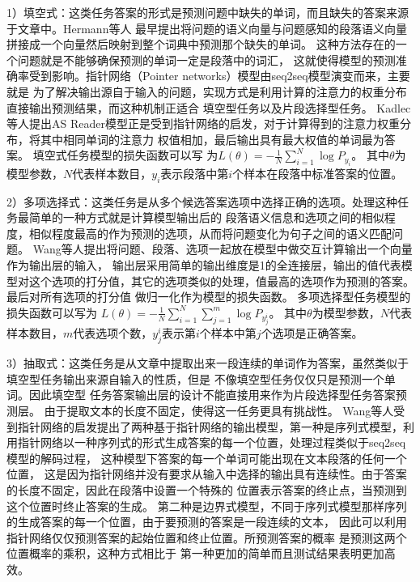 1）填空式：这类任务答案的形式是预测问题中缺失的单词，而且缺失的答案来源于文章中。Hermann等人\cite{Hermann}
最早提出将问题的语义向量与问题感知的段落语义向量拼接成一个向量然后映射到整个词典中预测那个缺失的单词。
这种方法存在的一个问题就是不能够确保预测的单词一定是段落中的词汇，
这就使得模型的预测准确率受到影响。指针网络（Pointer networks）模型由seq2seq模型演变而来，主要就是
为了解决输出源自于输入的问题，实现方式是利用计算的注意力的权重分布直接输出预测结果，而这种机制正适合
填空型任务以及片段选择型任务。
Kadlec等人提出AS Reader模型正是受到指针网络的启发，对于计算得到的注意力权重分布，将其中相同单词的注意力
权值相加，最后输出具有最大权值的单词最为答案。
填空式任务模型的损失函数可以写
为$L(\theta)=-\displaystyle\frac{1}{N}\sum_{i=1}^{N}\log P_{y_i}$。
其中$\theta$为模型参数，$N$代表样本数目，$y_i$表示段落中第$i$个样本在段落中标准答案的位置。

2）多项选择式：这类任务是从多个候选答案选项中选择正确的选项。处理这种任务最简单的一种方式就是计算模型输出后的
段落语义信息和选项之间的相似程度，相似程度最高的作为预测的选项，从而将问题变化为句子之间的语义匹配问题。
Wang等人\cite{Co-matching}提出将问题、段落、选项一起放在模型中做交互计算输出一个向量作为输出层的输入，
输出层采用简单的输出维度是1的全连接层，输出的值代表模型对这个选项的打分值，其它的选项类似的处理，值最高的选项作为预测的答案。
最后对所有选项的打分值
做归一化作为模型的损失函数。
多项选择型任务模型的损失函数可以写为
$L(\theta)=-\displaystyle\frac{1}{N}\sum_{i=1}^{N}\sum_{j=1}^{m}\log P_{y_{j}^i}$。
其中$\theta$为模型参数，$N$代表样本数目，$m$代表选项个数，$y_{j}^i$表示第$i$个样本中第$j$个选项是正确答案。

3）抽取式：这类任务是从文章中提取出来一段连续的单词作为答案，虽然类似于填空型任务输出来源自输入的性质，但是
不像填空型任务仅仅只是预测一个单词。因此填空型
任务答案输出层的设计不能直接用来作为片段选择型任务答案预测层。
由于提取文本的长度不固定，使得这一任务更具有挑战性。
Wang等人受到指针网络的启发提出了两种基于指针网络的输出模型，第一种是序列式模型，利用指针网络以一种序列式的形式生成答案的每一个位置，处理过程类似于seq2seq模型的解码过程，
这种模型下答案的每一个单词可能出现在文本段落的任何一个位置，
这是因为指针网络并没有要求从输入中选择的输出具有连续性。由于答案的长度不固定，因此在段落中设置一个特殊的
位置表示答案的终止点，当预测到这个位置时终止答案的生成。
第二种是边界式模型，不同于序列式模型那样序列的生成答案的每一个位置，由于要预测的答案是一段连续的文本，
因此可以利用指针网络仅仅预测答案的起始位置和终止位置。所预测答案的概率
是预测这两个位置概率的乘积，这种方式相比于
第一种更加的简单而且测试结果表明更加高效。



